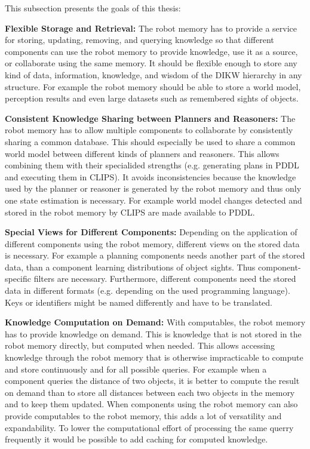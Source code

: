 \documentclass[a4paper,11pt]{article}
\begin{document}
This subsection presents the goals of this thesis:

\smallskip
\textbf{Flexible Storage and Retrieval:} The robot memory has to
provide a service for storing, updating, removing, and querying knowledge
so that different components can use the robot memory to provide knowledge,
use it as a source, or collaborate using the same memory. It should be
flexible enough to store any kind of data, information, knowledge, and
wisdom of the DIKW hierarchy in any structure. For example the robot
memory should be able to store a world model, perception results and
even large datasets such as remembered sights of objects.

\smallskip
\textbf{Consistent Knowledge Sharing between Planners and Reasoners:}
The robot memory has to allow multiple components to collaborate by
consistently sharing a common database. This should especially be used
to share a common world model between different kinds of planners and
reasoners.  This allows combining them with their specialided
strengths (e.g. generating plans in PDDL and executing them in CLIPS).
It avoids inconsistencies because the knowledge used by the planner or
reasoner is generated by the robot memory and thus only one state
estimation is necessary. For example world model changes detected and
stored in the robot memory by CLIPS are made available to PDDL.

\smallskip
\textbf{Special Views for Different Components:} Depending on the
application of different components using the robot memory, different
views on the stored data is necessary. For example a planning
components needs another part of the stored data, than a component
learning distributions of object sights. Thus component-specific
filters are necessary. Furthermore, different components need the
stored data in different formats (e.g. depending on the used
programming language). Keys or identifiers might be named differently
and have to be translated.

\smallskip
\textbf{Knowledge Computation on Demand:} With computables, the robot
memory has to provide knowledge on demand. This is knowledge that is
not stored in the robot memory directly, but computed when
needed. This allows accessing knowledge through the robot memory that
is otherwise impracticable to compute and store continuously and for
all possible queries. For example when a component queries the
distance of two objects, it is better to compute the result on demand
than to store all distances between each two objects in the memory and
to keep them updated. When components using the robot memory can also
provide computables to the robot memory, this adds a lot of
versatility and expandability. To lower the computational effort of
processing the same querry frequently it would be possible to add
caching for computed knowledge.
\end{document}
